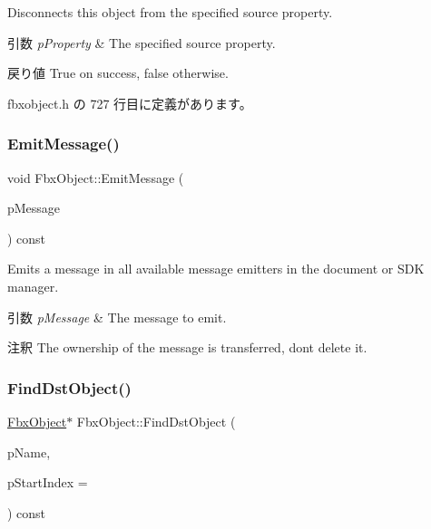 Disconnects this object from the specified source property. 
\begin{DoxyParams}{引数}
{\em p\+Property} & The specified source property. \\
\hline
\end{DoxyParams}
\begin{DoxyReturn}{戻り値}
{\ttfamily True} on success, {\ttfamily false} otherwise. 
\end{DoxyReturn}


 fbxobject.\+h の 727 行目に定義があります。

\mbox{\label{class_fbx_object_ae2fe13bc65c1ffe2c2338bc2a2740429}} 
\subsubsection{\texorpdfstring{Emit\+Message()}{EmitMessage()}}
{\footnotesize\ttfamily void Fbx\+Object\+::\+Emit\+Message (\begin{DoxyParamCaption}\item[{Fbx\+Message $\ast$}]{p\+Message }\end{DoxyParamCaption}) const}

Emits a message in all available message emitters in the document or S\+DK manager. 
\begin{DoxyParams}{引数}
{\em p\+Message} & The message to emit. \\
\hline
\end{DoxyParams}
\begin{DoxyRemark}{注釈}
The ownership of the message is transferred, don\textquotesingle{}t delete it. 
\end{DoxyRemark}
\mbox{\label{class_fbx_object_aebbe10e118482bb99048432fabd71194}} 
\subsubsection{\texorpdfstring{Find\+Dst\+Object()}{FindDstObject()}\hspace{0.1cm}{\footnotesize\ttfamily [1/4]}}
{\footnotesize\ttfamily \hyperlink{class_fbx_object}{Fbx\+Object}$\ast$ Fbx\+Object\+::\+Find\+Dst\+Object (\begin{DoxyParamCaption}\item[{const char $\ast$}]{p\+Name,  }\item[{int}]{p\+Start\+Index = {} }\end{DoxyParamCaption}) const\hspace{0.3cm}{\ttfamily [inline]}}

